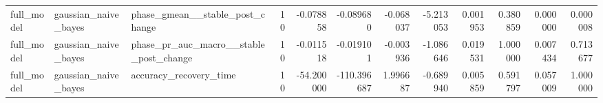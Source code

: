 \begin{tabular}{lllrrrrrrrrr}
full\_model & gaussian\_naive\_bayes & phase\_gmean\_\_stable\_post\_change & 10 & -0.078858 & -0.089680 & -0.068037 & -5.213053 & 0.001953 & 0.380859 & 0.000000 & 0.000008 \\
full\_model & gaussian\_naive\_bayes & phase\_pr\_auc\_macro\_\_stable\_post\_change & 10 & -0.011518 & -0.019101 & -0.003936 & -1.086646 & 0.019531 & 1.000000 & 0.007434 & 0.713677 \\
full\_model & gaussian\_naive\_bayes & accuracy\_recovery\_time & 10 & -54.200000 & -110.396687 & 1.996687 & -0.689940 & 0.005859 & 0.591797 & 0.057009 & 1.000000 \\
\bottomrule
\end{tabular}
